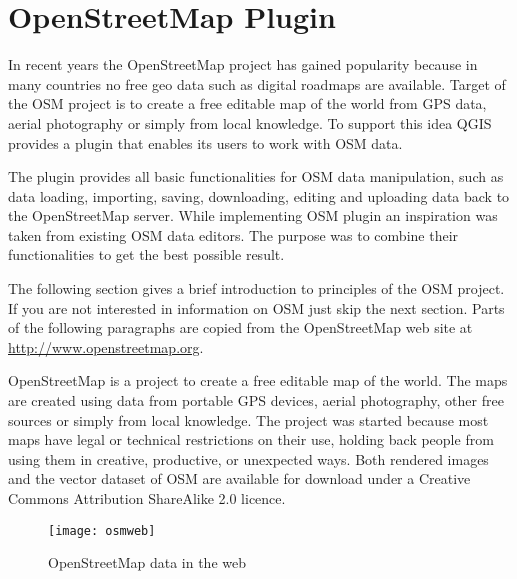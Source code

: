 
\section{OpenStreetMap Plugin}


In recent years the OpenStreetMap project has gained popularity because in 
many countries no free geo data such as digital roadmaps are available. 
Target of the OSM project is to create a free editable map of the world 
from GPS data, aerial photography or simply from local knowledge. To 
support this idea QGIS provides a plugin that enables its users to work
with OSM data.

The plugin provides all basic functionalities for OSM data manipulation, 
such as data loading, importing, saving, downloading, editing and 
uploading data back to the OpenStreetMap server. While implementing OSM 
plugin an inspiration was taken from existing OSM data editors. The 
purpose was to combine their functionalities to get the best
possible result.

The following section gives a brief introduction to principles of the OSM 
project. If you are not interested in information on OSM just skip the next 
section. Parts of the following paragraphs are copied from the 
OpenStreetMap web site at \url{http://www.openstreetmap.org}.


OpenStreetMap is a project to create a free editable map of the world. The
maps are created using data from portable GPS devices, aerial photography,
other free sources or simply from local knowledge. The project was started
because most maps have legal or technical restrictions on their use, holding
back people from using them in creative, productive, or unexpected ways. Both
rendered images and the vector dataset of OSM are available for download
under a Creative Commons Attribution ShareAlike 2.0 licence.

\begin{figure}[ht]
   \begin{center}
   \caption{OpenStreetMap data in the web \nixcaption}\label{fig:osmweb}\smallskip
   \texttt{[image: osmweb]}
\end{center}
\end{figure}

